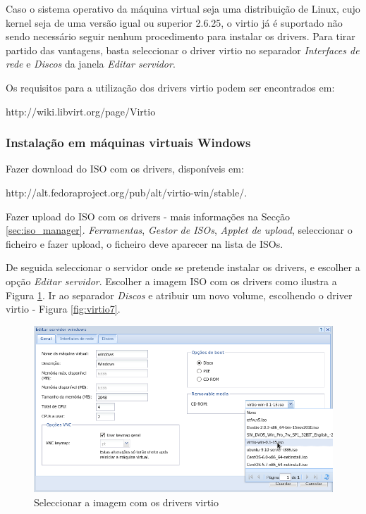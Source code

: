 Caso o sistema operativo da máquina virtual seja uma distribuição de Linux, cujo kernel seja de uma versão igual ou superior 2.6.25, o virtio já é suportado não sendo necessário seguir nenhum procedimento para instalar os drivers. Para tirar partido das vantagens, basta seleccionar o driver virtio no separador \textit{Interfaces de rede} e \textit{Discos} da janela \textit{Editar servidor}.

Os requisitos para a utilização dos drivers virtio podem ser encontrados em: 

http://wiki.libvirt.org/page/Virtio

\subsubsection*{Instalação em máquinas virtuais Windows}

Fazer download do ISO com os drivers, disponíveis em:

http://alt.fedoraproject.org/pub/alt/virtio-win/stable/.

Fazer upload do ISO com os drivers - mais informações na Secção \ref{sec:iso_manager}. \textit{Ferramentas}, \textit{Gestor de ISOs}, \textit{Applet de upload}, seleccionar o ficheiro e fazer upload, o ficheiro deve aparecer na lista de ISOs.

De seguida seleccionar o servidor onde se pretende instalar os drivers, e escolher a opção \textit{Editar servidor}. Escolher a imagem ISO com os drivers como ilustra a Figura \ref{fig:virtio4}. Ir ao separador \textit{Discos} e atribuir um novo volume, escolhendo o driver virtio - Figura \ref{fig:virtio7}.

\begin{figure}[H]
	\begin{center}
	\includegraphics[scale=0.5]{screenshots/virtio/virtio_4.png}
	\caption{Seleccionar a imagem com os drivers virtio}
	\label{fig:virtio4}
	\end{center}
\end{figure}

